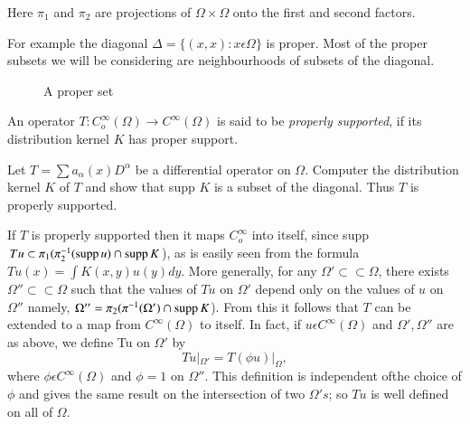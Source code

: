 Here $\pi_1$ and $\pi_2$ are projections of $\Omega \times \Omega$
onto the first and second factors. 

For example the diagonal $\Delta = \{ (x,x): x \epsilon \Omega \}$
is proper. Most of the proper subsets we will be considering are
neighbourhoods of subsets of the diagonal. 

\begin{figure}[H]
\caption{A proper set}
\end{figure}

\setcounter{defi}{22}
\begin{defi}\label{chap4:sec4:def4.23} %
  An operator $T: C^{\infty}_o (\Omega) \to C^{\infty}(\Omega)$ is said
  to be \textit{ properly supported}, if its distribution kernel $K$ has
  proper support. 
\end{defi}

\begin{exercise}
  Let $T = \sum a_{\alpha}(x) D^{\alpha}$ be a differential operator on
  $\Omega$. Computer the distribution kernel $K$ of $T$ and show that
  supp $K$ is a subset of the diagonal. Thus $T$ is properly supported. 
\end{exercise}

If $T$ is properly supported then it maps $C^{\infty}_o$ into itself,
since supp $Tu \subset \pi_1 (\pi^{-1}_2 (\operatorname{supp} u) \cap  \operatorname{supp} K$),
as is easily seen from the formula $Tu(x) = \int K(x,y) u(y) dy$. More
generally, for any $\Omega' \subset \subset \Omega$, there exists
$\Omega'' \subset \subset \Omega$ such that the values of $Tu $ on
$\Omega'$ depend  only on the values of $u$ on $\Omega''$ namely,
$\Omega'' = \pi_2(\pi^{-1}(\Omega') \cap  \operatorname{supp} K$). From this it
follows that $T$ can be extended to a map from $C^{\infty}(\Omega)$ to
itself. In fact, if $u \epsilon C^{\infty}(\Omega)$ and $\Omega',
\Omega''$ are as above, we define Tu on $\Omega'$ by  
$$
Tu|_{\Omega'} = T(\phi u) |_{\Omega},
$$
where $\phi \epsilon C^{\infty}(\Omega)$ and $\phi = 1$ on
$\Omega''$. This definition is independent of\pageoriginale the choice
of $\phi$ and 
gives the same result on the intersection of two $\Omega ' s$; so $Tu$
is well defined on all of $\Omega$. 

